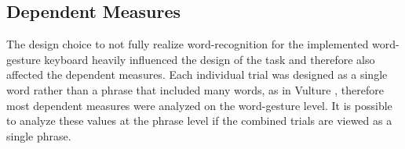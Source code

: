 \begin{table}[h] %
	\centering
	\caption[Pilot Study Schedule of Assessments]{\centering Schedule of Assessments for a single study visit (in minutes).}
	\label{pilot_schedule_of_assessments}
\end{table}
	
\subsection{Dependent Measures} \label{pilot_dependent_measures}
The design choice to not fully realize word-recognition for the implemented word-gesture keyboard heavily influenced the design of the task and therefore also affected the dependent measures. Each individual trial was designed as a single word rather than a phrase that included many words, as in Vulture \cite{ref_vulture}, therefore most dependent measures were analyzed on the word-gesture level. It is possible to analyze these values at the phrase level if the combined trials are viewed as a single phrase.


